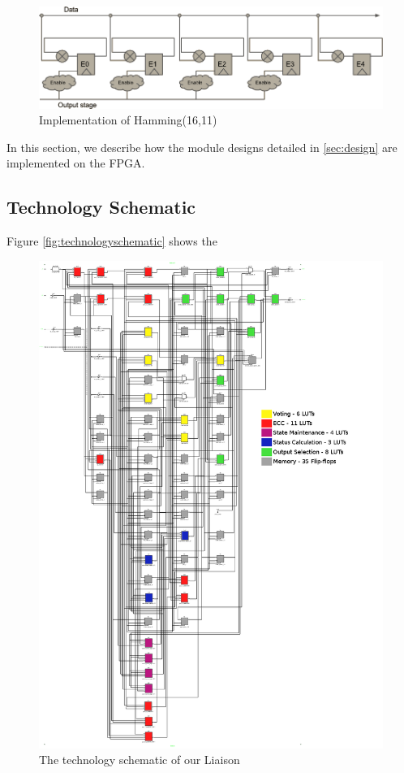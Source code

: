 
\begin{figure}
\includegraphics[width=15cm]{implementation/fig_ecc}
\caption{Implementation of Hamming(16,11)}
\label{fig:ecc}
\end{figure}

In this section, we describe how the module designs detailed in
\autoref{sec:design} are implemented on the FPGA. 

\subsection{Technology Schematic}
\label{sec:technologyschematic}

Figure \autoref{fig:technologyschematic} shows the 

\begin{figure}[phtb]
  \centering
  \includegraphics[width=1.25\textwidth]{LUT-count}
  \caption{The technology schematic of our Liaison}
  \label{fig:technologyschematic}
\end{figure}


